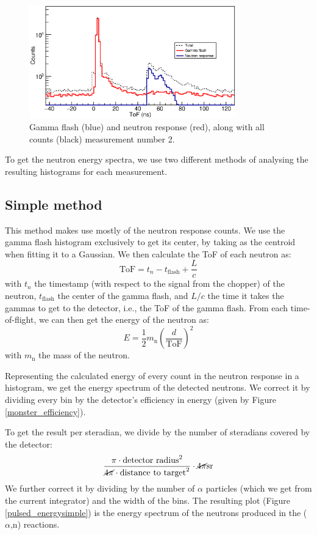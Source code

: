 \documentclass[a4paper,12pt]{report}
\newcommand{\an}{($\alpha$,n) }
\begin{document}
\begin{figure}[H]
	\centering
	\includegraphics[width=0.80\textwidth]{separated_tof.eps}
	\caption{Gamma flash (blue) and neutron response (red), along with all counts (black) measurement number 2.}
	\label{separated_tof}
\end{figure}

To get the neutron energy spectra, we use two different methods of analysing the resulting histograms for each measurement.

\subsection{Simple method}
This method makes use mostly of the neutron response counts.
We use the gamma flash histogram exclusively to get its center, by taking as the centroid when fitting it to a Gaussian.
We then calculate the ToF of each neutron as:
\begin{equation}
	\text{ToF} = t_n-t_\text{flash}+\frac{L}{c}
\end{equation}
with $t_n$ the timestamp (with respect to the signal from the chopper) of the neutron, $t_\text{flash}$ the center of the gamma flash, and $L/c$ the time it takes the gammas to get to the detector, i.e., the ToF of the gamma flash.
From each time-of-flight, we can then get the energy of the neutron as:
\begin{equation}
	E=\frac{1}{2} m_\text{n} \left( \frac{d}{\text{ToF}} \right)^2
\end{equation}
with $m_\text{n}$ the mass of the neutron.

Representing the calculated energy of every count in the neutron response in a histogram, we get the energy spectrum of the detected neutrons.
We correct it by dividing every bin by the detector's efficiency in energy (given by Figure \ref{monster_efficiency}).

To get the result per steradian, we divide by the number of steradians covered by the detector:
\[ \frac{\pi \cdot \text{detector radius}^2}{\cancel{4 \pi} \cdot \text{distance to target}^2}\cdot \cancel{4\pi}\unit{sr}  \]
We further correct it by dividing by the number of $\alpha$ particles (which we get from the current integrator) and the width of the bins.
The resulting plot (Figure \ref{pulsed_energysimple}) is the energy spectrum of the neutrons produced in the \an reactions.
\end{document}

